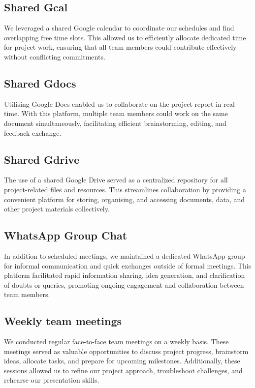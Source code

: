 \documentclass[a4paper,10pt]{article}
\begin{document}
\subsection{Shared Gcal}
We leveraged a shared Google calendar to coordinate our schedules and find overlapping free time slots. This allowed us to efficiently allocate dedicated time for project work, ensuring that all team members could contribute effectively without conflicting commitments.

\subsection{Shared Gdocs}
Utilising Google Docs enabled us to collaborate on the project report in real-time. With this platform, multiple team members could work on the same document simultaneously, facilitating efficient brainstorming, editing, and feedback exchange.

\subsection{Shared Gdrive}
The use of a shared Google Drive served as a centralized repository for all project-related files and resources. This streamlines collaboration by providing a convenient platform for storing, organising, and accessing documents, data, and other project materials collectively.

\subsection{WhatsApp Group Chat}
 In addition to scheduled meetings, we maintained a dedicated WhatsApp group for informal communication and quick exchanges outside of formal meetings. This platform facilitated rapid information sharing, idea generation, and clarification of doubts or queries, promoting ongoing engagement and collaboration between team members.

\subsection{Weekly team meetings}
We conducted regular face-to-face team meetings on a weekly basis. These meetings served as valuable opportunities to discuss project progress, brainstorm ideas, allocate tasks, and prepare for upcoming milestones. Additionally, these sessions allowed us to refine our project approach, troubleshoot challenges, and rehearse our presentation skills.
\end{document}
